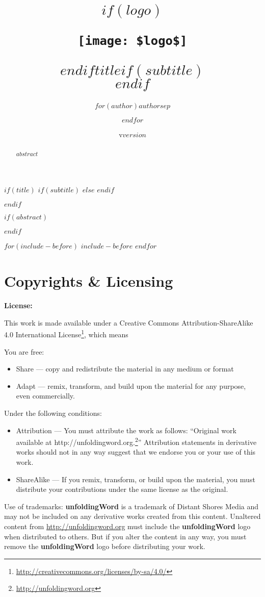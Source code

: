 \documentclass[$if(fontsize)$$fontsize$,$endif$$if(lang)$$lang$,$endif$$if(papersize)$$papersize$,$endif$$for(classoption)$$classoption$$sep$,$endfor$,openany,twoside]{$documentclass$}
\title{$if(logo)$\begin{center}\texttt{[image: \$logo\$]}\end{center}\vspace{\baselineskip}$endif$\Huge $title$$if(subtitle)$\\\vspace{0.5em}{\LARGE $subtitle$}$endif$}
\author{$for(author)$$author$$sep$ \and $endfor$}
\date{v$version$}
\renewcommand{\href}[2]{#2\footnote{\url{#1}}}
\begin{document}
$if(title)$
  \makeatletter
  $if(subtitle)$
  $else$
  $endif$
  \makeatother
  \maketitle
  \clearpage
$endif$


$if(abstract)$
  \begin{abstract}
  $abstract$
  \end{abstract}
  \clearpage
$endif$

$for(include-before)$
  $include-before$
$endfor$

\pagestyle{licensepage}

\section{Copyrights \& Licensing}\label{copyrights-licensing}

\textbf{License:}

This work is made available under a
\href{http://creativecommons.org/licenses/by-sa/4.0/}{Creative Commons
Attribution-ShareAlike 4.0 International License}, which means

You are free:

\begin{itemize}
\item
  Share --- copy and redistribute the material in any medium or format
\item
  Adapt --- remix, transform, and build upon the material for any
  purpose, even commercially.
\end{itemize}

Under the following conditions:

\begin{itemize}
\item
  Attribution --- You must attribute the work as follows: ``Original
  work available at
  \href{http://unfoldingword.org}{http://unfoldingword.org.}''
  Attribution statements in derivative works should not in any way
  suggest that we endorse you or your use of this work.
\item
  ShareAlike --- If you remix, transform, or build upon the material,
  you must distribute your contributions under the same license as the
  original.
\end{itemize}

Use of trademarks: \textbf{unfoldingWord} is a trademark of Distant
Shores Media and may not be included on any derivative works created
from this content. Unaltered content from \url{http://unfoldingword.org}
must include the \textbf{unfoldingWord} logo when distributed to others.
But if you alter the content in any way, you must remove the
\textbf{unfoldingWord} logo before distributing your work.
\end{document}
